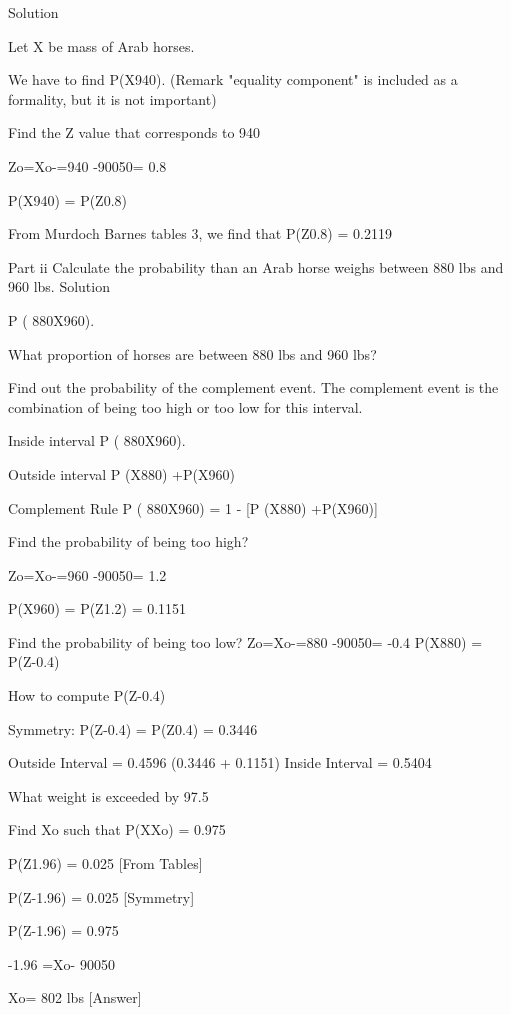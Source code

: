 \documentclass[12pt]{report}
\begin{document}
Solution

Let X be mass of Arab horses.

We have to find P(X940).            (Remark "equality component" is included as a formality, but it is not important)


Find the Z value that corresponds to 940 

Zo=Xo-=940 -90050= 0.8

P(X940) = P(Z0.8) 


From Murdoch Barnes tables 3, we find that  P(Z0.8) = 0.2119



Part ii Calculate the probability than an Arab horse weighs between 880 lbs and 960 lbs.
Solution 

P ( 880X960).


What proportion of horses are between 880 lbs and 960 lbs?

Find out the probability of the complement event.
The complement event is the combination of being too high  or too low for this interval.

Inside interval P ( 880X960).

Outside interval P (X880) +P(X960)

Complement Rule P ( 880X960)  = 1 - [P (X880) +P(X960)]



Find the probability of being too high?

Zo=Xo-=960 -90050= 1.2

P(X960) = P(Z1.2) = 0.1151


Find the probability of being too low?
Zo=Xo-=880 -90050= -0.4 
P(X880) = P(Z-0.4)  

How to compute P(Z-0.4)

Symmetry: 	P(Z-0.4) = P(Z0.4) = 0.3446


Outside Interval = 0.4596        (0.3446 +  0.1151)
Inside Interval = 0.5404



What weight is exceeded by 97.5%

Find Xo  such that P(XXo) = 0.975


P(Z1.96) = 0.025     [From Tables] 

P(Z-1.96) = 0.025  [Symmetry]

P(Z-1.96) = 0.975         

-1.96 =Xo- 90050


Xo= 802 lbs  [Answer]
\end{document}
